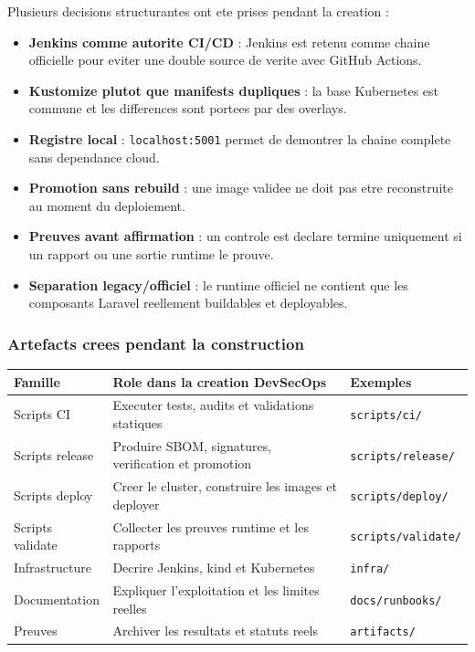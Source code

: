 Plusieurs decisions structurantes ont ete prises pendant la creation :

\begin{itemize}
  \item \textbf{Jenkins comme autorite CI/CD} : Jenkins est retenu comme chaine
  officielle pour eviter une double source de verite avec GitHub Actions.
  \item \textbf{Kustomize plutot que manifests dupliques} : la base Kubernetes
  est commune et les differences sont portees par des overlays.
  \item \textbf{Registre local} : \texttt{localhost:5001} permet de demontrer
  la chaine complete sans dependance cloud.
  \item \textbf{Promotion sans rebuild} : une image validee ne doit pas etre
  reconstruite au moment du deploiement.
  \item \textbf{Preuves avant affirmation} : un controle est declare termine
  uniquement si un rapport ou une sortie runtime le prouve.
  \item \textbf{Separation legacy/officiel} : le runtime officiel ne contient
  que les composants Laravel reellement buildables et deployables.
\end{itemize}

\subsubsection{Artefacts crees pendant la construction}

\begin{center}
\renewcommand{\arraystretch}{1.2}
\begin{tabular}{|p{38mm}|p{65mm}|p{42mm}|}
\hline
\textbf{Famille} & \textbf{Role dans la creation DevSecOps} & \textbf{Exemples} \\
\hline
Scripts CI & Executer tests, audits et validations statiques & \texttt{scripts/ci/} \\
\hline
Scripts release & Produire SBOM, signatures, verification et promotion & \texttt{scripts/release/} \\
\hline
Scripts deploy & Creer le cluster, construire les images et deployer & \texttt{scripts/deploy/} \\
\hline
Scripts validate & Collecter les preuves runtime et les rapports & \texttt{scripts/validate/} \\
\hline
Infrastructure & Decrire Jenkins, kind et Kubernetes & \texttt{infra/} \\
\hline
Documentation & Expliquer l'exploitation et les limites reelles & \texttt{docs/runbooks/} \\
\hline
Preuves & Archiver les resultats et statuts reels & \texttt{artifacts/} \\
\hline
\end{tabular}
\end{center}

